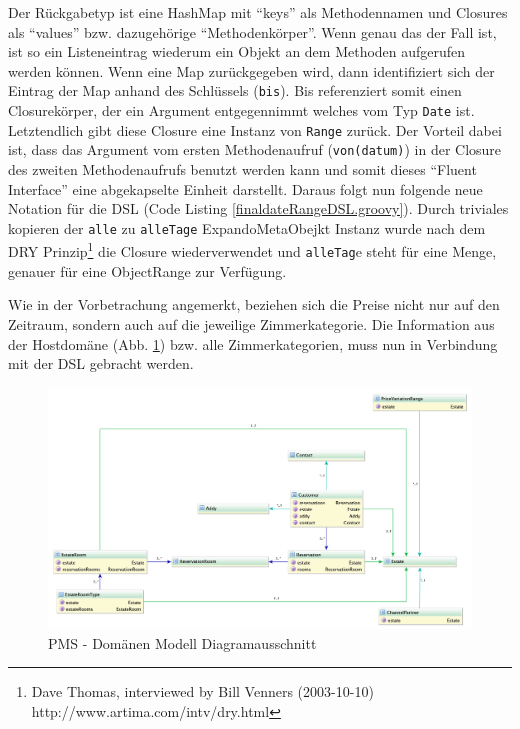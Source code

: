 \documentclass[11pt,english,ngerman, headsepline]{scrreprt}
\begin{document}
Der Rückgabetyp ist eine HashMap mit ``keys'' als Methodennamen und Closures als
``values'' bzw. dazugehörige ``Methodenkörper''.
Wenn genau das der Fall ist, ist so ein Listeneintrag wiederum ein Objekt an
dem Methoden aufgerufen werden können. Wenn eine Map zurückgegeben wird, dann
identifiziert sich der Eintrag der Map anhand des Schlüssels (\texttt{bis}).
Bis referenziert somit einen Closurekörper, der ein Argument entgegennimmt
welches vom Typ \texttt{Date} ist. Letztendlich gibt diese Closure eine Instanz
von \texttt{Range} zurück. Der Vorteil dabei ist, dass das Argument vom ersten
Methodenaufruf (\texttt{von(datum)}) in der Closure des zweiten Methodenaufrufs
benutzt werden kann und somit dieses ``Fluent Interface'' eine abgekapselte
Einheit darstellt.
Daraus folgt nun folgende neue Notation für die DSL (Code Listing
\ref{finaldateRangeDSL.groovy}).
Durch triviales kopieren der \texttt{alle} zu \texttt{alleTage} ExpandoMetaObejkt
Instanz wurde nach dem DRY Prinzip\footnote{Dave Thomas, interviewed by Bill Venners
(2003-10-10) http://www.artima.com/intv/dry.html} die Closure
wiederverwendet und \texttt{alleTag}e steht für eine Menge, genauer für eine
ObjectRange zur Verfügung.


 
Wie in der Vorbetrachung angemerkt, beziehen sich die Preise nicht nur auf den
Zeitraum, sondern auch auf die jeweilige Zimmerkategorie.
Die Information aus der Hostdomäne (Abb. \ref{domainModelDia.png}) bzw. alle
Zimmerkategorien, muss nun in Verbindung mit der DSL gebracht werden.

 
\begin{figure}[h!]
	\begin{center}
	\includegraphics[width=1.3\textwidth,angle=90]{pics/domainModelDia.png}
	\end{center}
	\caption{PMS - Domänen Modell Diagramausschnitt}
	\label{domainModelDia.png}
\end{figure}
\end{document}
